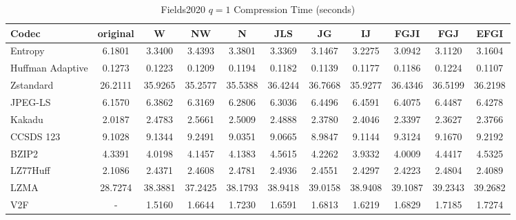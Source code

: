 \documentclass{article}
\begin{document}
\begin{table}[h!]
    \centering
    \caption{Fields2020 $q=1$ Compression Time (seconds)}
    \begin{tabular}{|l|cccccccccc|}
        \hline
        Codec &  original &      W &     NW &      N &    JLS &     JG &     IJ &   FGJI &    FGJ &   EFGI \\ \hline
        Entropy &    6.1801 & 3.3400 & 3.4393 & 3.3801 & 3.3369 & 3.1467 & 3.2275 & 3.0942 & 3.1120 & 3.1604 \\ \hline
Huffman Adaptive                                &    0.1273 &  0.1223 &  0.1209 &  0.1194 &  0.1182 &  0.1139 &  0.1177 &  0.1186 &  0.1224 &  0.1107 \\
Zstandard                              &   26.2111 & 35.9265 & 35.2577 & 35.5388 & 36.4244 & 36.7668 & 35.9277 & 36.4346 & 36.5199 & 36.2198 \\
JPEG-LS                                &    6.1570 &  6.3862 &  6.3169 &  6.2806 &  6.3036 &  6.4496 &  6.4591 &  6.4075 &  6.4487 &  6.4278 \\
Kakadu                         &    2.0187 &  2.4783 &  2.5661 &  2.5009 &  2.4888 &  2.3780 &  2.4046 &  2.3397 &  2.3627 &  2.3766 \\
CCSDS 123 &    9.1028 &  9.1344 &  9.2491 &  9.0351 &  9.0665 &  8.9847 &  9.1144 &  9.3124 &  9.1670 &  9.2192 \\
BZIP2                               &    4.3391 &  4.0198 &  4.1457 &  4.1383 &  4.5615 &  4.2262 &  3.9332 &  4.0009 &  4.4417 &  4.5325 \\
LZ77Huff                        &    2.1086 &  2.4371 &  2.4608 &  2.4781 &  2.4936 &  2.4551 &  2.4297 &  2.4223 &  2.4804 &  2.4089 \\
LZMA                           &   28.7274 & 38.3881 & 37.2425 & 38.1793 & 38.9418 & 39.0158 & 38.9408 & 39.1087 & 39.2343 & 39.2682 \\
V2F                      &   - &  1.5160 &  1.6644 &  1.7230 &  1.6591 &  1.6813 &  1.6219 &  1.6829 &  1.7185 &  1.7274 \\
        \hline
    \end{tabular}
\end{table}
\newpage
\end{document}
